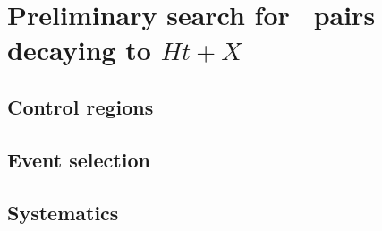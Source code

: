 \clearpage{\pagestyle{empty}\cleardoublepage}

\chapter{Preliminary search  for \TTbar\ pairs decaying to $Ht+X$}\label{chap:htx}

\section{Control regions}\label{sec:htxCR}

\section{Event selection}\label{sec:htxEVT}



\section{Systematics}\label{sec:htxSYS}
